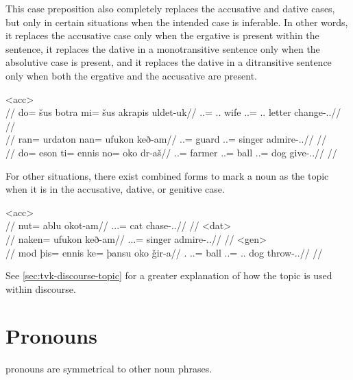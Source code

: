 This case preposition also completely replaces the accusative and dative cases, but only in certain situations when the intended case is inferable. In other words, it replaces the accusative case only when the ergative is present within the sentence, it replaces the dative in a monotransitive sentence only when the absolutive case is present, and it replaces the dative in a ditransitive sentence only when both the ergative and the accusative are present.

	\a<acc>\begingl
		\glpreamble{}\\
		//
		\gla do= šus botra mi= šus akrapis uldet-uk//
		\glb \An.\Sg.\Erg= \Tpp.\An.\Gen{} wife \In.\Sg.\Top= \Tpp.\An.\Gen{} letter change-\Ind.\Pst.\Pfv//
		\glft{}//
	\endgl
	\a<dat-st>\begingl
		\glpreamble{}\\
		//
		\gla ran= urdaton nan= ufukon keð-am//
		\glb \An.\Pl.\Abs= guard \An.\Pl.\Top= singer admire-\Ind.\Pst.\Ipfv//
		\glft{}//
	\endgl
	\a<dat-ac>\begingl
		\glpreamble{}\\
		//
		\gla do= eson ti= ennis no= oko dr-aš//
		\glb \An.\Sg.\Erg= farmer \In.\Sg.\Acc= ball \An.\Sg.\Top= dog give-\Ind.\Npst.\Rtsp//
		\glft{}//
	\endgl
\xe

For other situations, there exist combined forms to mark a noun as the topic when it is in the accusative, dative, or genitive case.

	\a<acc>\begingl
		\glpreamble{}\\
		//
		\gla nut= ablu okot-am//
		\glb \An.\Sg.\Acc.\Top= cat chase-\Ind.\Pst.\Ipfv//
		\glft{}//
	\endgl
	\a<dat>\begingl
		\glpreamble{}\\
		//
		\gla naken= ufukon keð-am//
		\glb \An.\Pl.\Dat.\Top= singer admire-\Ind.\Pst.\Ipfv//
		\glft{}//
	\endgl
	\a<gen>\begingl
		\glpreamble{}\\
		//
		\gla mod þis= ennis ke= þansu oko ǧir-a//
		\glb \Fps.\Erg{} \In.\Sg.\Acc= ball \An.\Sg.\Dat= \Sps.\Gen.\Top{} dog throw-\Ind.\Npst.\Ipfv//
		\glft{}//
	\endgl
\xe

See \autoref{sec:tvk-discourse-topic} for a greater explanation of how the topic is used within discourse.

\section{Pronouns}
\label{sec:tvk-pronouns}

\langtvk{} pronouns are symmetrical to other noun phrases\autocite{wals-50}.
